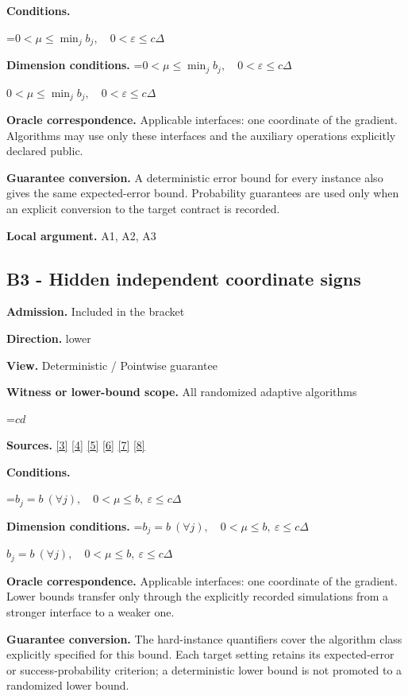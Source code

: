 \documentclass[10pt,a4paper]{article}
\newcommand{\AtlasMath}[1]{\par\begingroup\centering\setbox0=\hbox{$\displaystyle #1$}\ifdim\wd0>1.4\linewidth\typeout{ATLAS WIDE FORMULA: \the\wd0}\fi\ifdim\wd0>\linewidth\resizebox{\linewidth}{!}{\box0}\else\box0\fi\par\endgroup}
\newcommand{\AtlasInlineMath}[1]{\begingroup\setbox0=\hbox{$#1$}\ifdim\wd0>.4\linewidth\endgroup\AtlasMath{#1}\else\endgroup$#1$\fi}
\begin{document}
\textbf{Conditions.} 
\AtlasMath{0<\mu\le\min_jb_j,\quad0<\varepsilon\le c\Delta}


\textbf{Dimension conditions.} \AtlasInlineMath{0<\mu\le\min_jb_j,\quad0<\varepsilon\le c\Delta}

\textbf{Oracle correspondence.} Applicable interfaces: one coordinate of the gradient. Algorithms may use only these interfaces and the auxiliary operations explicitly declared public.

\textbf{Guarantee conversion.} A deterministic error bound for every instance also gives the same expected-error bound. Probability guarantees are used only when an explicit conversion to the target contract is recorded.

\textbf{Local argument.} A1, A2, A3

\subsection{B3 - Hidden independent coordinate signs}
\textbf{Admission.} Included in the bracket

\textbf{Direction.} lower

\textbf{View.} Deterministic / Pointwise guarantee

\textbf{Witness or lower-bound scope.} All randomized adaptive algorithms

\AtlasMath{cd}
\textbf{Sources.} \href{https://arxiv.org/pdf/1405.4980}{[3]} \href{https://arxiv.org/pdf/2101.09740v2}{[4]} \href{https://arxiv.org/pdf/2609.33360v2}{[5]} \href{https://arxiv.org/pdf/2609.10874}{[6]} \href{https://www2.isye.gatech.edu/~nemirovs/MOR_AccuracyCertificates.pdf}{[7]} \href{https://arxiv.org/pdf/2609.20701}{[8]}

\textbf{Conditions.} 
\AtlasMath{b_j=b\ (\forall j),\quad0<\mu\le b,\ \varepsilon\le c\Delta}


\textbf{Dimension conditions.} \AtlasInlineMath{b_j=b\ (\forall j),\quad0<\mu\le b,\ \varepsilon\le c\Delta}

\textbf{Oracle correspondence.} Applicable interfaces: one coordinate of the gradient. Lower bounds transfer only through the explicitly recorded simulations from a stronger interface to a weaker one.

\textbf{Guarantee conversion.} The hard-instance quantifiers cover the algorithm class explicitly specified for this bound. Each target setting retains its expected-error or success-probability criterion; a deterministic lower bound is not promoted to a randomized lower bound.
\end{document}
